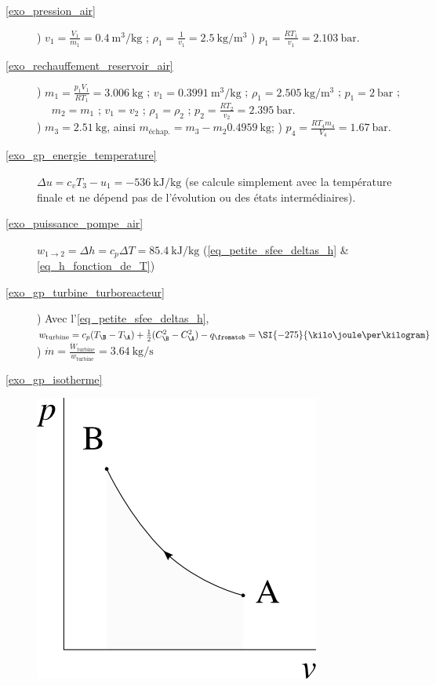 \begin{description}
	\item [\ref{exo_pression_air}] 
					) $v_1 = \frac{V_1}{m_1} = \SI{0,4}{\metre\cubed\per\kilogram}$ ; $\rho_1 = \frac{1}{v_1} = \SI{2,5}{\kilogram\per\metre\cubed}$
					) $p_1 = \frac{R T_1}{v_1} = \SI{2,103}{\bar}$.
	\item [\ref{exo_rechauffement_reservoir_air}] 
					) $m_1 = \frac{p_1 V_1}{R T_1} = \SI{3,006}{\kilogram}$ ; $v_1 = \SI{0,3991}{\metre\cubed\per\kilogram}$ ; $\rho_1 = \SI{2,505}{\kilogram\per\metre\cubed}$ ; $p_1 = \SI{2}{\bar}$ ;
					\tab ~~ $m_2 = m_1$ ; $v_1 = v_2$ ; $\rho_1 = \rho_2$ ; $p_2 = \frac{R T_2}{v_2} = \SI{2,395}{\bar}$.\\
					) $m_3 = \SI{2,51}{\kilogram}$, ainsi $m_\text{échap.} = m_3 - m_2 \SI{0,4959}{\kilogram}$; 
					) $p_4 = \frac{R T_4 m_4}{V_4} = \SI{1,67}{\bar}$.
	\item [\ref{exo_gp_energie_temperature}] 
					\tab $\Delta u = c_v T_3 - u_1 = \SI{-536}{\kilo\joule\per\kilogram}$ (se calcule simplement avec la température finale et ne dépend pas de l’évolution ou des états intermédiaires).
	\item [\ref{exo_puissance_pompe_air}] 
					\tab $w_{1\to 2} = \Delta h = c_p \Delta T = \SI{+85,4}{\kilo\joule\per\kilogram}$ (\ref{eq_petite_sfee_deltas_h} \& \ref{eq_h_fonction_de_T})
	\item [\ref{exo_gp_turbine_turboreacteur}] 
					) Avec l’\cref{eq_petite_sfee_deltas_h}, $w_\text{turbine} = c_p (T_\B - T_\A) + \frac{1}{2}(C_\B^2 - C_\A^2) - q_\fromatob = \SI{-275}{\kilo\joule\per\kilogram}$ 	
					) $\dot m = \frac{\dot W_\text{turbine}}{w_\text{turbine}} = \SI{3,64}{\kilogram\per\second}$
	\item [\ref{exo_gp_isotherme}]
					\includegraphics[width=\solutiondiagramwidth]{images/exo_sol_pv_isoth.png}

\end{description}
